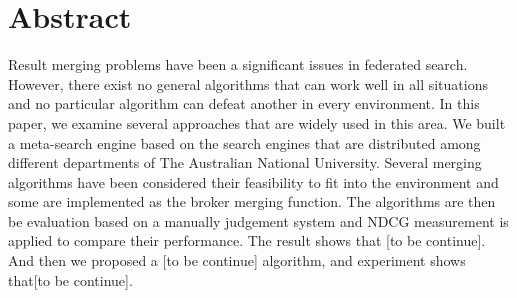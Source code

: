 \chapter*{Abstract}  %

Result merging problems have been a significant issues in federated search. However, there exist no general algorithms that can work well in all situations and no particular algorithm can defeat another in every environment. In this paper, we examine several approaches that are widely used in this area. We built a meta-search engine based on the search engines that are distributed among different departments of The Australian National University. Several merging algorithms have been considered their feasibility to fit into the environment and some are implemented as the broker merging function. The algorithms are then be evaluation based on a manually judgement system and NDCG measurement is applied to compare their performance. The result shows that [to be continue]. And then we proposed a [to be continue] algorithm, and experiment shows that[to be continue].

